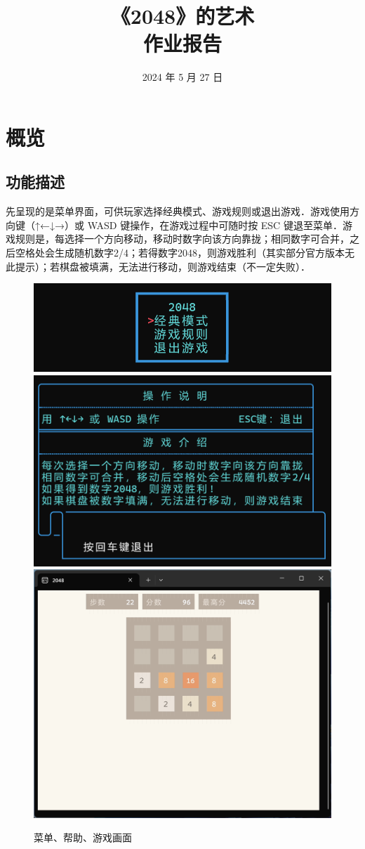 \documentclass[12pt,a4paper,twoside]{ctexart}
\title{{\bf\Huge 《2048》的艺术}\\ \normalsize 作业报告}
\date{2024 年 5 月 27 日}
\numberwithin{figure}{section}
\numberwithin{equation}{section}
\begin{document}
\maketitle
\setcounter{page}{0}
\thispagestyle{empty}

\newpage

\tableofcontents%


\newpage
{}

\section{概览}
\subsection{功能描述}


先呈现的是菜单界面，可供玩家选择经典模式、游戏规则或退出游戏．游戏使用方向键（↑←↓→）或 WASD 键操作，在游戏过程中可随时按 ESC 键退至菜单．游戏规则是，每选择一个方向移动，移动时数字向该方向靠拢；相同数字可合并，之后空格处会生成随机数字2/4；若得数字2048，则游戏胜利（其实部分官方版本无此提示）；若棋盘被填满，无法进行移动，则游戏结束（不一定失败）．

\begin{figure}[ht]
    \centering
    \includegraphics[width=.45\textwidth]{menu.png}
    \includegraphics[width=.45\textwidth]{displayHelp.png}\\
    \includegraphics[width=.5\textwidth]{displayInterface.png}
    \caption{菜单、帮助、游戏画面}
\end{figure}
\end{document}
